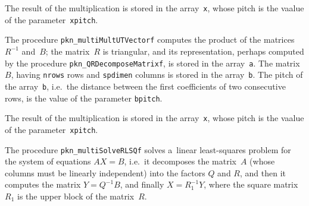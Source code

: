 The result of the multiplication is stored in the array~\texttt{x},
whose pitch is the vaalue of the parameter~\texttt{xpitch}.

\vspace{\bigskipamount}
The procedure \texttt{pkn\_multiMultUTVectorf} computes the product
of the matrices~$R^{-1}$ and~$B$; the matrix~$R$ is triangular,
and its representation, perhaps computed by the procedure
\texttt{pkn\_QRDecomposeMatrixf}, is stored in the array~\texttt{a}.
The matrix~$B$, having \texttt{nrows} rows and
\texttt{spdimen} columns is stored in the array~\texttt{b}.
The pitch of the array~\texttt{b}, i.e.\ the distance between the first
coefficients of two consecutive rows, is the value of the parameter
\texttt{bpitch}.

The result of the multiplication is stored in the array~\texttt{x},
whose pitch is the vaalue of the parameter~\texttt{xpitch}.

\vspace{\bigskipamount}

\vspace{\bigskipamount}
{}
The procedure \texttt{pkn\_multiSolveRLSQf} solves a~linear least-squares problem
for the system of equations
$AX=B$, i.e.\ it decomposes the matrix~$A$ (whose columns must be linearly
independent) into the factors $Q$ and $R$, and then it computes the matrix
$Y=Q^{-1}B$, and finally $X=R_1^{-1}Y$, where the square matrix~$R_1$ is the upper
block of the matrix~$R$.

